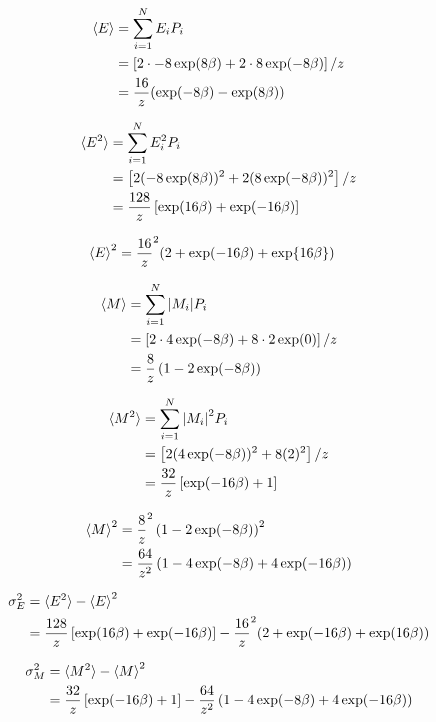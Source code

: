 \begin{align}
  \braket{E} &= \sum_{i=1}^{N} E_i P_i \\
             &= \left[2 \cdot -8 \exp(8\beta) + 2\cdot 8 \exp(-8\beta)\right] / z \\
             &= \frac{16}{z} ( \exp(-8\beta) - \exp(8\beta))
\end{align}


\begin{align}
  \braket{E^2} &= \sum_{i=1}^{N} E_i^2 P_i \\
                &= \left[ 2 (-8\exp(8\beta))^2 + 2 (8\exp(-8\beta))^2 \right] /z \\
                &= \frac{128}{z}\left[ \exp(16 \beta) + \exp(-16\beta)\right]
\end{align}

\begin{align}
  \braket{E}^2 &= \frac{16}{z}^2 ( 2 + \exp(-16\beta) + \exp{16\beta})
\end{align}

\begin{align}
  \braket{M} &= \sum_{i=1}^{N} \abs{M_i} P_i \\
             &= \left[2\cdot 4 \exp(-8\beta ) + 8 \cdot 2 \exp(0)\right] / z \\
             &= \frac{8}{z} \left( 1 - 2\exp(-8\beta) \right)
\end{align}


\begin{align}
  \braket{M^2} &= \sum_{i=1}^{N} \abs{M_i}^2 P_i \\
               &= \left[2 (4\exp(-8\beta))^2 + 8 (2)^2\right] / z \\
               &= \frac{32}{z} \left[ \exp(-16\beta) + 1 \right]
\end{align}

\begin{align}
  \braket{M}^2 &= \frac{8}{z}^2 \left( 1 - 2\exp(-8\beta) \right)^2 \\
               &= \frac{64}{z^2} \left( 1 - 4\exp(-8\beta) + 4\exp(-16\beta) \right)
\end{align}


\begin{align}
  \sigma_{E}^2 &= \braket{E^2} - \braket{E}^2 \\
               &= \frac{128}{z}\left[ \exp(16 \beta) + \exp(-16\beta)\right] - \frac{16}{z}^2 ( 2 + \exp(-16\beta) + \exp(16\beta))
\end{align}



\begin{align}
  \sigma_{M}^2 &= \braket{M^2} - \braket{M}^2 \\
               &=  \frac{32}{z} \left[ \exp(-16\beta) + 1 \right] - \frac{64}{z^2} \left( 1 - 4\exp(-8\beta) + 4\exp(-16\beta) \right)
\end{align}
